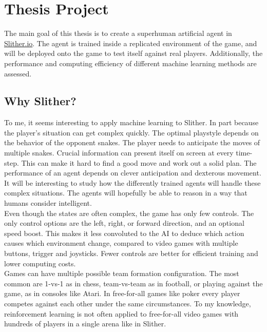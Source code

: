\section{Thesis Project}


The main goal of this thesis is to create a superhuman artificial agent in \href{https://Slither.io}{Slither.io}. The agent is trained inside a replicated environment of the game, and will be deployed onto the game to test itself against real players. Additionally, the performance and computing efficiency of different machine learning methods are assessed.
\\



\subsection{Why Slither?} %
To me, it seems interesting to apply machine learning to Slither. In part because the player's situation can get complex quickly. The optimal playstyle depends on the behavior of the opponent snakes. The player needs to anticipate the moves of multiple snakes. Crucial information can present itself on screen at every time-step. This can make it hard to find a good move and work out a solid plan. The performance of an agent depends on clever anticipation and dexterous movement. It will be interesting to study how the differently trained agents will handle these complex situations. The agents will hopefully be able to reason in a way that humans consider intelligent. 
\\[2.5mm]
Even though the states are often complex, the game has only few controls. The only control options are the left, right, or forward direction, and an optional speed boost. This makes it less convoluted to the AI to deduce which action causes which environment change, compared to video games with multiple buttons, trigger and joysticks. Fewer controls are better for efficient training and lower computing costs.
\\[2.5mm]
Games can have multiple possible team formation configuration. The most common are 1-vs-1 as in chess, team-vs-team as in football, or playing against the game, as in consoles like Atari. In free-for-all games like poker every player competes against each other under the same circumstances. To my knowledge, reinforcement learning is not often applied to free-for-all video games with hundreds of players in a single arena like in Slither. 
\\






